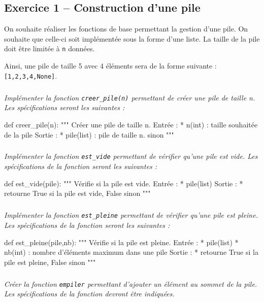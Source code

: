 \documentclass[10pt,fleqn]{article} %
\begin{document}

\vspace{8cm}
\pagestyle{fancy}
\thispagestyle{plain}


\def\columnseprulecolor{\color{ocre}}
\setlength{\columnseprule}{0.4pt} 
\begin{multicols}{2}
\section*{Exercice 1 -- Construction d'une pile}
On souhaite réaliser les fonctions de base permettant la gestion d'une pile. On souhaite que celle-ci soit implémentée sous la forme d'une liste. La taille de la pile doit être limitée à \texttt{n} données.

Ainsi, une pile de taille 5 avec 4 éléments sera de la forme suivante : \texttt{[1,2,3,4,None]}.

\subparagraph{}\textit{Implémenter la fonction \texttt{creer\_pile(n)} permettant de créer une pile de taille n.  Les spécifications seront les suivantes :}
\begin{py}
\begin{python}
def creer_pile(n):
    """
    Créer une pile de taille n.
    Entrée : 
     * n(int) : taille souhaitée de la pile
    Sortie : 
     * pile(list) : pile de taille n.
     sinon
    """
\end{python}
\end{py}

\subparagraph{}\textit{Implémenter la fonction \texttt{est\_vide} permettant de vérifier qu'une pile est vide. Les spécifications de la fonction seront les suivantes : }
\begin{py}
\begin{python}
def est_vide(pile):
    """
    Vérifie si la pile est vide.
    Entrée : 
     * pile(list)
    Sortie : 
     * retourne True si la pile est vide, False 
     sinon
    """
\end{python}
\end{py}
\subparagraph{}\textit{Implémenter la fonction \texttt{est\_pleine} permettant de vérifier qu'une pile est pleine. Les spécifications de la fonction seront les suivantes :}
\begin{py}
\begin{python}
def est_pleine(pile,nb):
    """
    Vérifie si la pile est pleine.
    Entrée : 
     * pile(list)
     * nb(int) : nombre d'éléments maximum dans une pile
    Sortie : 
     * retourne True si la pile est pleine, False 
     sinon
    """
\end{python}
\end{py}
\subparagraph{}\textit{Créer la fonction \texttt{empiler} permettant d'ajouter un élément au sommet de la pile. Les spécifications de la fonction devront être indiquées.}


\end{multicols}
\end{document}
